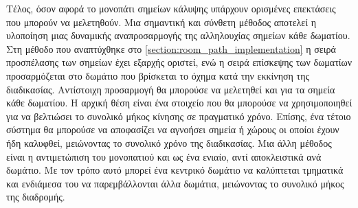 Τέλος, όσον αφορά το μονοπάτι σημείων κάλυψης υπάρχουν ορισμένες επεκτάσεις που μπορούν να μελετηθούν. Μια σημαντική και σύνθετη μέθοδος αποτελεί η υλοποίηση μιας δυναμικής αναπροσαρμογής της αλληλουχίας σημείων κάθε δωματίου. Στη μέθοδο που αναπτύχθηκε στο \autoref{section:room_path_implementation} η σειρά προσπέλασης των σημείων έχει εξαρχής οριστεί, ενώ η σειρά επίσκεψης των δωματίων προσαρμόζεται στο δωμάτιο που βρίσκεται το όχημα κατά την εκκίνηση της διαδικασίας. Αντίστοιχη προσαρμογή θα μπορούσε να μελετηθεί και για τα σημεία κάθε δωματίου. Η αρχική θέση είναι ένα στοιχείο που θα μπορούσε να χρησιμοποιηθεί για να βελτιώσει το συνολικό μήκος κίνησης σε πραγματικό χρόνο. Επίσης, ένα τέτοιο σύστημα θα μπορούσε να αποφασίζει να αγνοήσει σημεία ή χώρους οι οποίοι έχουν ήδη καλυφθεί, μειώνοντας το συνολικό χρόνο της διαδικασίας. Μια άλλη μέθοδος είναι η αντιμετώπιση του μονοπατιού και ως ένα ενιαίο, αντί αποκλειστικά ανά δωμάτιο. Με τον τρόπο αυτό μπορεί ένα κεντρικό δωμάτιο να καλύπτεται τμηματικά και ενδιάμεσα του να παρεμβάλλονται άλλα δωμάτια, μειώνοντας το συνολικό μήκος της διαδρομής.
